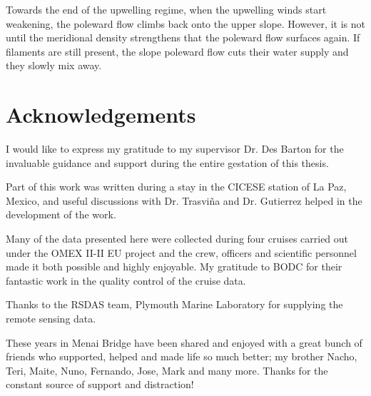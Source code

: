 \documentclass[12pt,twoside]{mythesis}
\begin{document}
Towards the end of the upwelling regime, when the upwelling winds
start weakening, the poleward flow climbs back onto the upper
slope. However, it is not until the meridional density strengthens
that the poleward flow surfaces again. If filaments are still
present, the slope poleward flow cuts their water supply and they
slowly mix away.
\chapter*{Acknowledgements}

I would like to express my gratitude to my supervisor Dr. Des
Barton for the invaluable guidance and support during the entire
gestation of this thesis.

Part of this work was written during a stay in the CICESE station
of La Paz, Mexico, and useful discussions with Dr. Trasvi\~na and
Dr. Gutierrez helped in the development of the work.

Many of the data presented here were collected during four cruises
carried out under the OMEX II-II EU project and the crew, officers
and scientific personnel made it both possible and highly
enjoyable. My gratitude to BODC for their fantastic work in the
quality control of the cruise data.

Thanks to the RSDAS team, Plymouth Marine Laboratory for supplying
the remote sensing data.

These years in Menai Bridge have been shared and enjoyed with a
great bunch of friends who supported, helped and made life so much
better; my brother Nacho, Teri, Maite, Nuno, Fernando, Jose, Mark
and many more. Thanks for the constant source of support and
distraction!


\allcontents



\cleardoublepage
\setcounter{chapter}{0}
\mainbody


%
\end{document}
